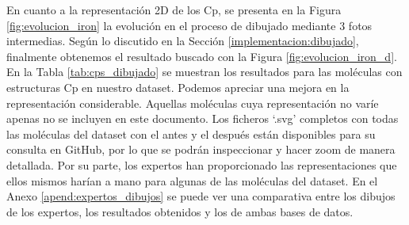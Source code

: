 En cuanto a la representación 2D de los Cp, se presenta en la Figura \ref{fig:evolucion_iron} la evolución en el proceso de dibujado mediante 3 fotos intermedias. Según lo discutido en la Sección \ref{implementacion:dibujado}, finalmente obtenemos el resultado buscado con la Figura \ref{fig:evolucion_iron_d}. En la Tabla \ref{tab:cps_dibujado} se muestran los resultados para las moléculas con estructuras Cp en nuestro dataset. Podemos apreciar una mejora en la representación considerable. Aquellas moléculas cuya representación no varíe apenas no se incluyen en este documento. Los ficheros `.svg' completos con todas las moléculas del dataset con el antes y el después están disponibles para su consulta en GitHub, por lo que se podrán inspeccionar y hacer zoom de manera detallada. Por su parte, los expertos han proporcionado las representaciones que ellos mismos harían a mano para algunas de las moléculas del dataset. En el Anexo \ref{apend:expertos_dibujos} se puede ver una comparativa entre los dibujos de los expertos, los resultados obtenidos y los de ambas bases de datos.

